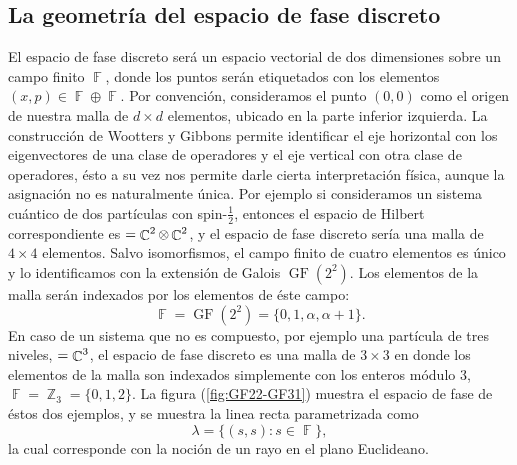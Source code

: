 \documentclass[a4paper]{report}
\DeclareMathOperator{\C}{\mathbb{C}}
\DeclareMathOperator{\Z}{\mathbb{Z}}
\DeclareMathOperator{\F}{\mathbb{F}}
\let\H\relax
\DeclareMathOperator{\H}{\mathcal H}
\DeclareMathOperator{\GF}{GF}
\begin{document}
  \subsection{La geometría del espacio de fase discreto}

  El espacio de fase discreto será un espacio vectorial de
  dos dimensiones sobre un campo finito $\F$, donde los
  puntos serán etiquetados con los elementos $(x,p) \in \F
  \oplus \F$. Por convención, consideramos el punto $(0,0)$
  como el origen de nuestra malla de $d \times d$ elementos,
  ubicado en la parte inferior izquierda. La construcción de
  Wootters y Gibbons permite identificar el eje horizontal
  con los eigenvectores de una clase de operadores y el eje
  vertical con otra clase de operadores, ésto a su vez nos
  permite darle cierta interpretación física, aunque la
  asignación no es naturalmente única. Por ejemplo si
  consideramos un sistema cuántico de dos partículas con
  spin-$\frac{1}{2}$, entonces el espacio de Hilbert
  correspondiente es $\H = \C^{2} \otimes \C^{2}$, y el
  espacio de fase discreto sería una malla de $4 \times 4$
  elementos. Salvo isomorfismos, el campo finito de cuatro
  elementos es único y lo identificamos con la extensión de
  Galois $\GF\left(2^2\right)$. Los elementos de la malla
  serán indexados por los elementos de éste campo:
  \[
    \F
    = \GF\left(2^2\right)
    = \{0,1,\alpha,\alpha+1\}.
  \]
  En caso de un sistema que no es compuesto, por ejemplo una
  partícula de tres niveles, $\H = \C^3$, el espacio de fase
  discreto es una malla de $3 \times 3$ en donde los
  elementos de la malla son indexados simplemente con los
  enteros módulo 3, $\F = \Z_3 = \{0,1,2\}$. La figura
  (\ref{fig:GF22-GF31}) muestra el espacio de fase de éstos
  dos ejemplos, y se muestra la linea recta parametrizada
  como 
  \[
    \lambda = \{(s,s) : s \in \F\},
  \]
  la cual corresponde con la noción de un rayo en el plano
  Euclideano.
\end{document}
